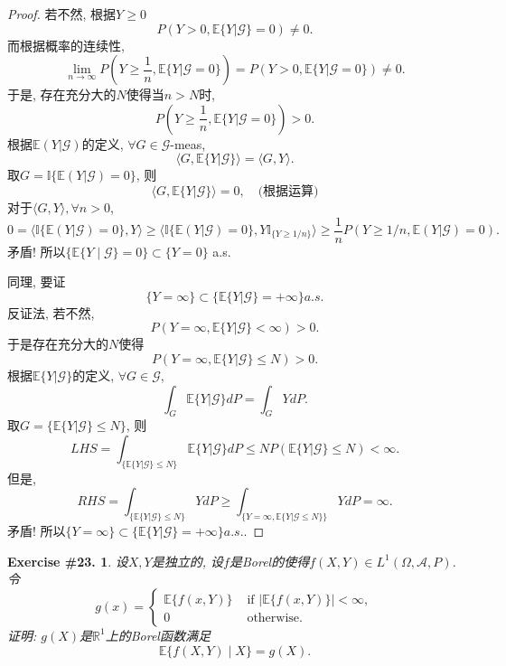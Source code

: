 \documentclass[UTF8, a4paper]{article}
\newtheorem{exercise}{Exercise \#23.}
\begin{document}
\begin{proof}
若不然, 根据\(Y \geq 0\)
$$
P(Y >0, \mathbb{E}\{Y|\mathcal{G}\} = 0) \neq 0.
$$
而根据概率的连续性, 
$$
\lim_{n\to \infty} P\left(Y \geq \frac{1}{n}, \mathbb{E}\{Y|\mathcal{G} = 0\}\right) = P( Y > 0, \mathbb{E}\{Y|\mathcal{G} = 0\}) \neq 0.
$$
于是, 存在充分大的\(N\)使得当\(n > N\)时, 
$$
P\left(Y \geq \frac{1}{n}, \mathbb{E}\{Y|\mathcal{G} = 0\}\right) > 0.
$$
根据\(\mathbb{E}(Y | \mathcal{G})\)的定义, \(\forall G \in\mathcal{G}\)-meas, 
$$
\langle G, \mathbb{E}\{Y|\mathcal{G}\}\rangle = \langle G, Y\rangle.
$$
取\(G = \mathbb{I}\{\mathbb{E}(Y|\mathcal{G}) = 0\}\), 则
$$
\langle G, \mathbb{E}\{Y|\mathcal{G}\}\rangle = 0, \quad \text{(根据运算)}
$$
对于\(\langle G, Y \rangle, \forall n > 0\), 
$$
0 = \langle \mathbb{I}\{\mathbb{E}(Y|\mathcal{G}) = 0\}, Y \rangle \geq \langle \mathbb{I}\{\mathbb{E}(Y|\mathcal{G}) = 0\}, Y \mathbb{I}_{\{Y \geq 1/n\}} \rangle \geq \frac{1}{n} P(Y \geq 1/n, \mathbb{E}(Y|\mathcal{G}) = 0).
$$
矛盾! 所以\(\{\mathbb{E}\{Y \mid \mathcal{G}\} = 0\} \subset \{Y = 0\}\) a.s.


同理, 要证 
$$
\{Y = \infty\} \subset \{\mathbb{E}\{Y|\mathcal{G}\} = + \infty\} a.s.
$$
反证法, 若不然, 
$$
P(Y = \infty, \mathbb{E}\{Y|\mathcal{G}\} <\infty) > 0.
$$
于是存在充分大的\(N\)使得
$$
P(Y = \infty, \mathbb{E}\{Y|\mathcal{G}\} \leq N) > 0.
$$
根据\(\mathbb{E}\{Y|\mathcal{G}\}\)的定义, \(\forall G \in \mathcal{G}\),
$$
\int_G \mathbb{E}\{Y|\mathcal{G}\} dP = \int_G Y dP.
$$
取\(G = \{\mathbb{E}\{Y|\mathcal{G}\} \leq N\}\), 则
$$
LHS = \int_{\{\mathbb{E}\{Y|\mathcal{G}\} \leq N\}} \mathbb{E}\{Y|\mathcal{G}\} dP \leq N P(\mathbb{E}\{Y|\mathcal{G}\} \leq N) < \infty.
$$
但是, 
$$
RHS = \int_{\{\mathbb{E}\{Y|\mathcal{G}\} \leq N\}} Y dP \geq \int_{\{Y = \infty, \mathbb{E}\{Y|\mathcal{G} \leq N\}\}} Y dP = \infty.
$$
矛盾! 所以\(\{Y = \infty\} \subset \{\mathbb{E}\{Y|\mathcal{G}\} = + \infty\} a.s.\).


\end{proof}


\begin{framed}
\begin{exercise}
设\(X, Y\)是独立的, 设\(f\)是Borel的使得\(f(X,Y) \in L^1(\Omega, \mathcal{A}, P)\).
令
$$g(x)=\left\{\begin{array}{cc}\mathbb{E}\{f(x,Y)\}&\text{ if }|\mathbb{E}\{f(x,Y)\}|<\infty,\\0&\text{ otherwise.}\end{array}\right.$$
证明: \(g(X)\)是\(\mathbb{R}^1\)上的Borel函数满足
$$
\mathbb{E}\{f(X, Y) \mid X\} = g(X).
$$
\end{exercise}
\end{framed}
\end{document}
